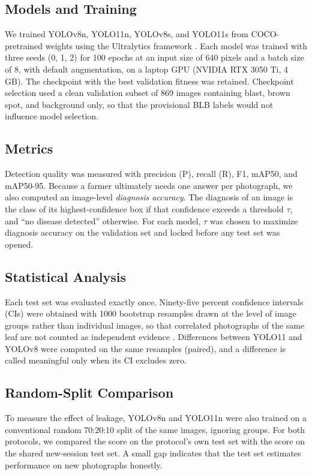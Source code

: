\documentclass[conference,a4paper]{IEEEtran}
\begin{document}
\subsection{Models and Training}
We trained YOLOv8n, YOLO11n, YOLOv8s, and YOLO11s from COCO-pretrained weights \cite{lin2014} using the Ultralytics framework \cite{ultralytics_v8,ultralytics_11}. Each model was trained with three seeds (0, 1, 2) for 100 epochs at an input size of 640 pixels and a batch size of 8, with default augmentation, on a laptop GPU (NVIDIA RTX 3050 Ti, 4 GB). The checkpoint with the best validation fitness was retained. Checkpoint selection used a clean validation subset of 869 images containing blast, brown spot, and background only, so that the provisional BLB labels would not influence model selection.

\subsection{Metrics}
Detection quality was measured with precision (P), recall (R), F1, mAP50, and mAP50-95. Because a farmer ultimately needs one answer per photograph, we also computed an image-level \emph{diagnosis accuracy}. The diagnosis of an image is the class of its highest-confidence box if that confidence exceeds a threshold $\tau$, and ``no disease detected'' otherwise. For each model, $\tau$ was chosen to maximize diagnosis accuracy on the validation set and locked before any test set was opened.

\subsection{Statistical Analysis}
Each test set was evaluated exactly once. Ninety-five percent confidence intervals (CIs) were obtained with 1000 bootstrap resamples drawn at the level of image groups rather than individual images, so that correlated photographs of the same leaf are not counted as independent evidence \cite{efron1993}. Differences between YOLO11 and YOLOv8 were computed on the same resamples (paired), and a difference is called meaningful only when its CI excludes zero.

\subsection{Random-Split Comparison}
To measure the effect of leakage, YOLOv8n and YOLO11n were also trained on a conventional random 70:20:10 split of the same images, ignoring groups. For both protocols, we compared the score on the protocol's own test set with the score on the shared new-session test set. A small gap indicates that the test set estimates performance on new photographs honestly.
\end{document}
